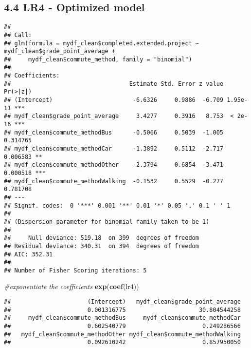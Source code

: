 \documentclass[
]{article}
\newenvironment{Shaded}{\begin{snugshade}}{\end{snugshade}}
\newcommand{\AttributeTok}[1]{\textcolor[rgb]{0.13,0.29,0.53}{#1}}
\newcommand{\CommentTok}[1]{\textcolor[rgb]{0.56,0.35,0.01}{\textit{#1}}}
\newcommand{\FunctionTok}[1]{\textcolor[rgb]{0.13,0.29,0.53}{\textbf{#1}}}
\newcommand{\NormalTok}[1]{#1}
\newcommand{\OtherTok}[1]{\textcolor[rgb]{0.56,0.35,0.01}{#1}}
\newcommand{\SpecialCharTok}[1]{\textcolor[rgb]{0.81,0.36,0.00}{\textbf{#1}}}
\newcommand{\StringTok}[1]{\textcolor[rgb]{0.31,0.60,0.02}{#1}}
\begin{document}
\subsection{4.4 LR4 - Optimized model}\label{lr4---optimized-model}

\begin{Shaded}
\end{Shaded}

\begin{verbatim}
## 
## Call:
## glm(formula = mydf_clean$completed.extended.project ~ mydf_clean$grade_point_average + 
##     mydf_clean$commute_method, family = "binomial")
## 
## Coefficients:
##                                  Estimate Std. Error z value Pr(>|z|)    
## (Intercept)                       -6.6326     0.9886  -6.709 1.95e-11 ***
## mydf_clean$grade_point_average     3.4277     0.3916   8.753  < 2e-16 ***
## mydf_clean$commute_methodBus      -0.5066     0.5039  -1.005 0.314765    
## mydf_clean$commute_methodCar      -1.3892     0.5112  -2.717 0.006583 ** 
## mydf_clean$commute_methodOther    -2.3794     0.6854  -3.471 0.000518 ***
## mydf_clean$commute_methodWalking  -0.1532     0.5529  -0.277 0.781708    
## ---
## Signif. codes:  0 '***' 0.001 '**' 0.01 '*' 0.05 '.' 0.1 ' ' 1
## 
## (Dispersion parameter for binomial family taken to be 1)
## 
##     Null deviance: 519.18  on 399  degrees of freedom
## Residual deviance: 340.31  on 394  degrees of freedom
## AIC: 352.31
## 
## Number of Fisher Scoring iterations: 5
\end{verbatim}

\begin{Shaded}
\begin{Highlighting}[]
\CommentTok{\#exponentiate the coefficients}
\FunctionTok{exp}\NormalTok{(}\FunctionTok{coef}\NormalTok{(lr4))}
\end{Highlighting}
\end{Shaded}

\begin{verbatim}
##                      (Intercept)   mydf_clean$grade_point_average 
##                      0.001316775                     30.804544258 
##     mydf_clean$commute_methodBus     mydf_clean$commute_methodCar 
##                      0.602540779                      0.249286566 
##   mydf_clean$commute_methodOther mydf_clean$commute_methodWalking 
##                      0.092610242                      0.857950050
\end{verbatim}
\end{document}
